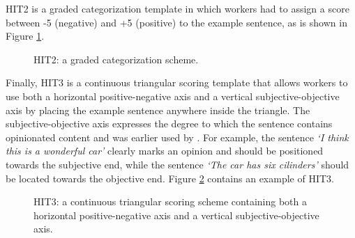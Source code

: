\documentclass[11pt, a4paper,onecolumn]{article}
\begin{document}
HIT2 is a graded categorization template in which workers had to assign a score between -5 (negative) and +5 (positive) to the example sentence, as is shown in Figure \ref{hit2}. 

\begin{figure}[ht]
  \begin{center}
	\caption{HIT2: a graded categorization scheme.}
	\label{hit2}
  \end{center}
\end{figure}



Finally, HIT3 is a continuous triangular scoring template that allows workers to use both a horizontal positive-negative axis and a vertical subjective-objective axis by placing the example sentence anywhere inside the triangle. The subjective-objective axis expresses the degree to which the sentence contains opinionated content and was earlier used by \cite{sentiwordnet:06}. For example, the sentence \textit{`I think this is a wonderful car'} clearly marks an opinion and should be positioned towards the subjective end, while the sentence \textit{`The car has six cilinders'} should be located towards the objective end. Figure \ref{hit3} contains an example of HIT3. 

\begin{figure}[ht]
  \begin{center}
	\caption{HIT3: a continuous triangular scoring scheme containing both a horizontal positive-negative axis and a vertical subjective-objective axis.}
	\label{hit3}
  \end{center}
\end{figure}
\end{document}
